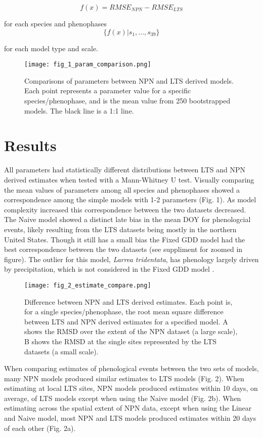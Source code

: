 \documentclass[fleqn,10pt,lineno]{wlpeerj} %
\begin{document}
$$ f(x) = RMSE_{NPN} - RMSE_{LTS} $$

for each species and phenophases  $$\{ f(x) | s_{1},...,s_{39}\} $$ 

for each model type and scale.  

\begin{figure}[]
	\centering
		\texttt{[image: fig\_1\_param\_comparison.png]}
	\caption{Comparisons of parameters between NPN and LTS derived models. Each point represents a parameter value for a specific species/phenophase, and is the mean value from 250 bootstrapped  models. The black line is a 1:1 line.}
\end{figure}


\section*{Results}

All parameters had statistically different distributions between LTS and NPN derived estimates when tested with a Mann-Whitney U test. Visually comparing the mean values of parameters among all species and phenophases showed a correspondence among the simple models with 1-2 parameters (Fig. 1). As model complexity increased this correspondence between the two datasets decreased. The Naive model showed a distinct late bias in the mean DOY for phenologcial events, likely resulting from the LTS datasets being mostly in the northern United States. Though it still has a small bias the Fixed GDD model had the best correspondence between the two datasets (see suppliment for zoomed in figure). The outlier for this model, \textit{Larrea tridentata}, has phenology largely driven by precipitation, which is not considered in the Fixed GDD model \citep{beatley1974}. 

\begin{figure}
	\centering
		\texttt{[image: fig\_2\_estimate\_compare.png]}
	\caption{Difference between NPN and LTS derived estimates. Each point is, for a single species/phenophase, the root mean square difference between LTS and NPN derived estimates for a specified model. A shows the RMSD over the extent of the NPN dataset (a large scale), B shows the RMSD at the single sites represented by the LTS datasets (a small scale).}
\end{figure}

When comparing estimates of phenological events between the two sets of models, many NPN models produced similar estimates to LTS models (Fig. 2). When estimating at local LTS sites, NPN models produced estimates within 10 days, on average, of LTS models except when using the Naive model (Fig. 2b). When estimating across the spatial extent of NPN data, except when using the Linear and Naive model, most NPN and LTS models produced estimates within 20 days of each other (Fig. 2a). 
\end{document}
